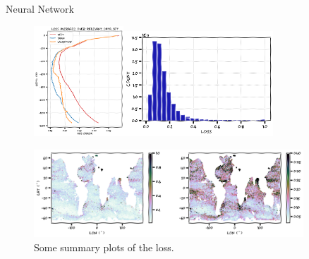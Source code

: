 \documentclass[xcolor=x11names,compress]{beamer}
\renewcommand{\(}{\begin{columns}}
\renewcommand{\)}{\end{columns}}
\newcommand{\<}[1]{\begin{column}{#1}}
\renewcommand{\>}{\end{column}}
\begin{document}

\begin{frame}{Neural Network}

\begin{figure}
  \includegraphics[width=0.3\textwidth]{argo_data_neural_network_RMS}\includegraphics[width=0.5\textwidth]{argo_data_neural_network_RMS_historgram} 
  
  \includegraphics[width=0.9\textwidth]{argo_data_neural_network_loss_spatial}
  \caption{Some summary plots of the loss.}
\end{figure}

\end{frame}

\end{document}
